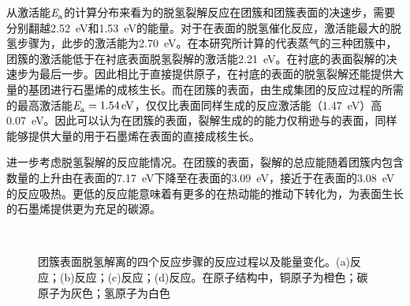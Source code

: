     从激活能$\it E_{\rm a}^{\rm } \it$的计算分布来看为的脱氢裂解反应在团簇和团簇表面的决速步，需要分别翻越\SI{2.52}{\electronvolt}和\SI{1.53}{\electronvolt}的能量。对于在表面的脱氢催化反应，激活能最大的脱氢步骤为，此步的激活能为\SI{2.70}{\electronvolt}。在本研究所计算的代表蒸气的三种团簇中，团簇的激活能低于在衬底表面脱氢裂解的激活能\SI{2.21}{\electronvolt}。在衬底的表面裂解的决速步为最后一步。因此相比于直接提供原子，在衬底的表面的脱氢裂解还能提供大量的基团进行石墨烯的成核生长。而在团簇的表面，由生成集团的反应过程的所需的最高激活能$\it E_{\rm a}^{\rm } \it=\SI{1.54}{\electronvolt}$，仅仅比表面同样生成的反应激活能（\SI{1.47}{\electronvolt}）高\SI{0.07}{\electronvolt}。因此可以认为在团簇的表面，裂解生成的的能力仅稍逊与的表面，同样能够提供大量的用于石墨烯在表面的直接成核生长。 

    进一步考虑脱氢裂解的反应能情况。在团簇的表面，裂解的总应能随着团簇内包含数量的上升由在表面的\SI{7.17}{\electronvolt}下降至在表面的\SI{3.09}{\electronvolt}，接近于在表面的\SI{3.08}{\electronvolt}的反应吸热。更低的反应能意味着有更多的在热动能的推动下转化为，为表面生长的石墨烯提供更为充足的碳源。
    
    \begin{figure}[htb]
        \\[-0.5ex]
        \caption{团簇表面脱氢解离的四个反应步骤的反应过程以及能量变化。(a)反应\mbox{；}(b)反应\mbox{；}(c)反应\mbox{；}(d)反应。在原子结构中，铜原子为橙色；碳原子为灰色；氢原子为白色}
        \label{fig:CG_DFT_Cu3-CH4-C}
    \end{figure}

